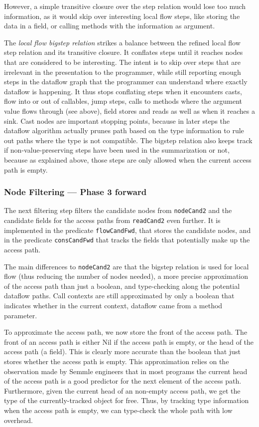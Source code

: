 However, a simple transitive closure over the step relation would lose too much 
information, as it would skip over interesting local flow steps,
like storing the data in a field, or calling methods with the information as 
argument.

The \emph{local flow bigstep relation} strikes a balance between the refined 
local flow step relation and its transitive closure.
It conflates steps until it reaches nodes that are considered to be interesting.
The intent is to skip over steps that are irrelevant in the presentation
to the programmer, while still 
reporting enough steps in the dataflow graph that the programmer can understand 
where exactly dataflow is happening.
It thus stops conflating steps when it encounters casts, flow into or out of callables,
jump steps, calls to methods where the argument value flows through (see above), field 
stores and reads as well as when it reaches a sink. 
Cast nodes are important stopping points, because in later steps the dataflow 
algorithm actually prunes path based on the type information to rule out 
paths where the type is not compatible.
The bigstep relation also keeps track if non-value-preserving steps have been used 
in the summarization or not, because as explained above, those steps are only allowed 
when the current access path is empty.

\subsubsection*{Node Filtering --- Phase 3 forward}
The next filtering step filters the candidate nodes from \texttt{nodeCand2}
and the candidate fields for the access paths from \texttt{readCand2} even further.
It is implemented in the predicate \texttt{flowCandFwd}, that stores the candidate nodes,
and in the predicate \texttt{consCandFwd} that tracks the fields that potentially 
make up the access path.

The main differences to \texttt{nodeCand2} are that the bigstep relation is 
used for local flow (thus reducing the number of nodes needed), 
a more precise approximation of the access path than just a boolean,
and type-checking along the potential dataflow paths.
Call contexts are still approximated by only a boolean that indicates whether 
in the current context, dataflow came from a method parameter.

To approximate the access path, we now store the front of the access path.
The front of an access path is either Nil if the access path is empty,
or the head of the access path (a field).
This is clearly more accurate than the boolean that just stores whether the 
access path is empty.
This approximation relies on the observation made by Semmle engineers that
in most programs the current head of the access path is a
good predictor for the next element of the access path.
Furthermore, given the current head of an non-empty access path, we get the 
type of the currently-tracked object for free.
Thus, by tracking type information when the access path is empty, we can type-check
the whole path with low overhead.


